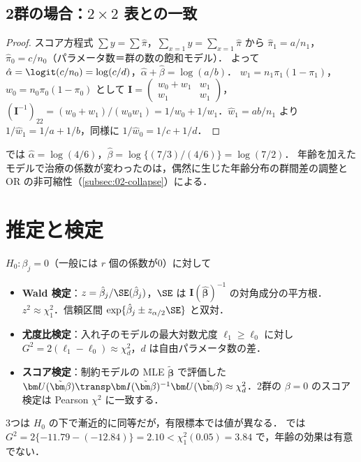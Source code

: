 \subsection{2群の場合：\texorpdfstring{$2\times2$}{2×2} 表との一致}\label{subsec:06-2group}
\begin{proof}
スコア方程式 $\sum y=\sum\hat\pi$，$\sum_{x=1}y=\sum_{x=1}\hat\pi$ から $\hat\pi_1=a/n_1$，$\hat\pi_0=c/n_0$（パラメータ数＝群の数の飽和モデル）．
よって $\hat\alpha=\logit(c/n_0)=\log(c/d)$，$\hat\alpha+\hat\beta=\log(a/b)$．
$w_1=n_1\pi_1(1-\pi_1)$，$w_0=n_0\pi_0(1-\pi_0)$ として $\bm I=\begin{pmatrix}w_0+w_1&w_1\\ w_1&w_1\end{pmatrix}$，
$(\bm I^{-1})_{22}=(w_0+w_1)/(w_0w_1)=1/w_0+1/w_1$．$\hat w_1=ab/n_1$ より $1/\hat w_1=1/a+1/b$，同様に $1/\hat w_0=1/c+1/d$．
\end{proof}
 では $\hat\alpha=\log(4/6)$，$\hat\beta=\log\{(7/3)/(4/6)\}=\log(7/2)$．
年齢を加えたモデルで治療の係数が変わったのは，偶然に生じた年齢分布の群間差の調整と OR の非可縮性（\cref{subsec:02-collapse}）による．

\section{推定と検定}\label{sec:06-test}
$H_0:\beta_j=0$（一般には $r$ 個の係数が0）に対して
\begin{itemize}
\item \textbf{Wald 検定}：$z=\hat\beta_j/\SE(\hat\beta_j)$，$\SE$ は $\bm I(\hat{\bm\beta})^{-1}$ の対角成分の平方根．$z^2\approx\chi^2_1$．信頼区間 $\exp\{\hat\beta_j\pm z_{\alpha/2}\SE\}$ と双対．
\item \textbf{尤度比検定}：入れ子のモデルの最大対数尤度 $\ell_1\ge\ell_0$ に対し $G^2=2(\ell_1-\ell_0)\approx\chi^2_{d}$，$d$ は自由パラメータ数の差．
\item \textbf{スコア検定}：制約モデルの MLE $\tilde{\bm\beta}$ で評価した $\bm U(\tilde{\bm\beta})\transp\bm I(\tilde{\bm\beta})^{-1}\bm U(\tilde{\bm\beta})\approx\chi^2_d$．2群の $\beta=0$ のスコア検定は Pearson $\chi^2$ に一致する．
\end{itemize}
3つは $H_0$ の下で漸近的に同等だが，有限標本では値が異なる．
 では $G^2=2\{-11.79-(-12.84)\}=2.10<\chi^2_1(0.05)=3.84$ で，年齢の効果は有意でない．

